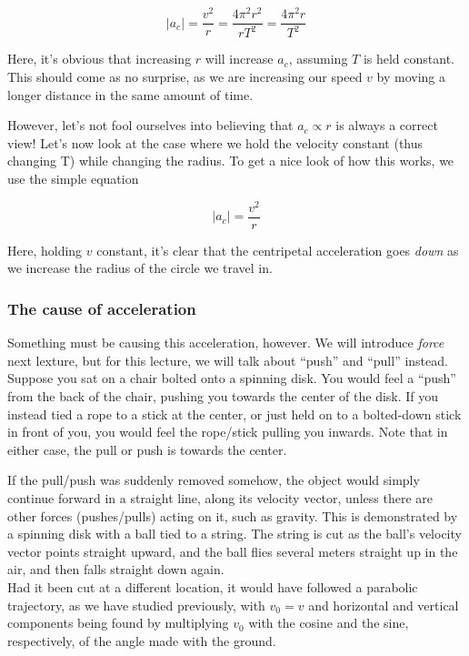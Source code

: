 \documentclass[12pt,a4paper]{report}
\begin{document}
\begin{equation}
|a_c| = \frac{v^2}{r} = \frac{4 \pi^2 r^2}{r T^2} = \frac{4 \pi^2 r}{T^2}
\end{equation}

Here, it's obvious that increasing $r$ will increase $a_c$, assuming $T$ is held constant. This should come as no surprise, as we are increasing our speed $v$ by moving a longer distance in the same amount of time.

However, let's not fool ourselves into believing that $a_c \propto r$ is always a correct view! Let's now look at the case where we hold the velocity constant (thus changing T) while changing the radius. To get a nice look of how this works, we use the simple equation

\begin{equation}
|a_c| = \frac{v^2}{r}
\end{equation}

Here, holding $v$ constant, it's clear that the centripetal acceleration goes \emph{down} as we increase the radius of the circle we travel in.

\subsubsection{The cause of acceleration}

Something must be causing this acceleration, however. We will introduce \emph{force} next lexture, but for this lecture, we will talk about ``push'' and ``pull'' instead. Suppose you sat on a chair bolted onto a spinning disk. You would feel a ``push'' from the back of the chair, pushing you towards the center of the disk. If you instead tied a rope to a stick at the center, or just held on to a bolted-down stick in front of you, you would feel the rope/stick pulling you inwards. Note that in either case, the pull or push is towards the center.

If the pull/push was suddenly removed somehow, the object would simply continue forward in a straight line, along its velocity vector, unless there are other forces (pushes/pulls) acting on it, such as gravity. This is demonstrated by a spinning disk with a ball tied to a string. The string is cut as the ball's velocity vector points straight upward, and the ball flies several meters straight up in the air, and then falls straight down again.\\
Had it been cut at a different location, it would have followed a parabolic trajectory, as we have studied previously, with $v_0 = v$ and horizontal and vertical components being found by multiplying $v_0$ with the cosine and the sine, respectively, of the angle made with the ground.
\end{document}
